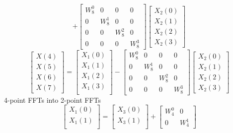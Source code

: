 \documentclass[journal,12pt,twocolumn]{IEEEtran}
\numberwithin{equation}{section}
\renewcommand\thesection{\arabic{section}}
\begin{document}
\begin{enumerate}[label=\arabic*.,ref=\thesection.\theenumi]
\begin{equation}
+
\begin{bmatrix}
W^{0}_{8} & 0 & 0 & 0\\
0 & W^{1}_{8} & 0 & 0\\
0 & 0 & W^{2}_{8} & 0\\
0 & 0 & 0 & W^{3}_{8}
\end{bmatrix}
\begin{bmatrix}
X_{2}(0) \\ 
X_{2}(1) \\ 
X_{2}(2) \\
X_{2}(3)
\end{bmatrix}
\end{equation}
\begin{equation}
\begin{bmatrix}
X(4) \\ 
X(5) \\ 
X(6) \\ 
X(7)
\end{bmatrix}
=
\begin{bmatrix}
X_{1}(0) \\ 
X_{1}(1)\\ 
X_{1}(2)\\
X_{1}(3)\\
\end{bmatrix}
-
\begin{bmatrix}
W^{0}_{8} & 0 & 0 & 0\\
0 & W^{1}_{8} & 0 & 0\\
0 & 0 & W^{2}_{8} & 0\\
0 & 0 & 0 & W^{3}_{8}
\end{bmatrix}
\begin{bmatrix}
X_{2}(0) \\ 
X_{2}(1) \\ 
X_{2}(2) \\
X_{2}(3)
\end{bmatrix}
\end{equation}
4-point FFTs into 2-point FFTs
\begin{equation}
\begin{bmatrix}
X_{1}(0) \\ 
X_{1}(1)\\ 
\end{bmatrix}
=
\begin{bmatrix}
X_{3}(0) \\ 
X_{3}(1)\\ 
\end{bmatrix}
+
\begin{bmatrix}
W^{0}_{4} & 0\\
0 & W^{1}_{4}

\end{bmatrix}
\end{equation}
\end{enumerate}
\end{document}
